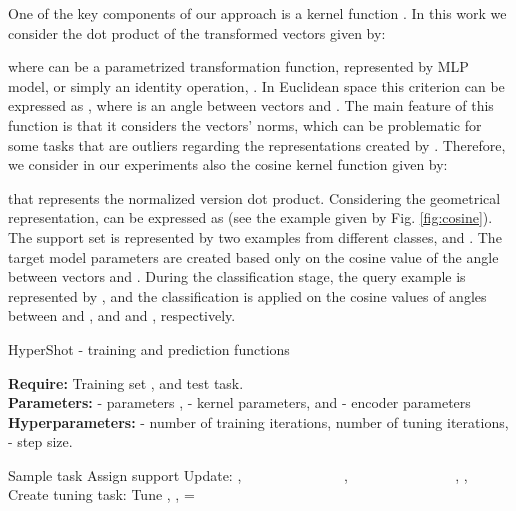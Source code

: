 \documentclass[nohyperref]{article}
\def\our{HyperShot}
\theoremstyle{plain}
\theoremstyle{definition}
\theoremstyle{remark}
\begin{document}
One of the key components of our approach is a kernel function . In this work we consider the dot product of the transformed vectors given by:


where  can be a parametrized transformation function, represented by MLP model, or simply an identity operation, . In Euclidean space this criterion can be expressed as , where  is an angle between vectors  and . The main feature of this function is that it considers the vectors' norms, which can be problematic for some tasks that are outliers regarding the representations created by . Therefore, we consider in our experiments also the cosine kernel function given by:


that represents the normalized version dot product. Considering the geometrical representation,  can be expressed as  (see the example given by Fig. \ref{fig:cosine}). The support set is represented by two examples from different classes,  and . The target model parameters  are created based only on the cosine value of the angle between vectors  and . During the classification stage, the query example is represented by , and the classification is applied on the cosine values of angles between  and , and  and , respectively. 


\begin{algorithm}[t]
\small
    \caption{\our{} - training and prediction functions}
    \label{alg_overview}
    \textbf{Require:} Training set , and  test task. \\
    \textbf{Parameters:}   -  parameters ,  - kernel parameters, and  - encoder parameters\\ \textbf{Hyperparameters:}  - number of training iterations,  number of tuning iterations, - step size.
    \begin{algorithmic}[1]
        \vspace{0.1cm} 
            \While{}
                \State Sample task 
                \State Assign support 
                \State 
                    \State Update: ,
                    \State \ \ \ \ \ \ \ \ \ \ \ \ \ \ ,
                    \State \ \ \ \ \ \ \ \ \ \ \ \ \ \ 
                    \State 
            \EndWhile
            \State \Return , , 
        \EndFunction
        \vspace{0.1cm} 
            \State Create tuning task: 
            \State Tune , ,  = 
                \State \Return 
            \EndFor
\EndFunction
    \end{algorithmic}
\end{algorithm}
\end{document}
